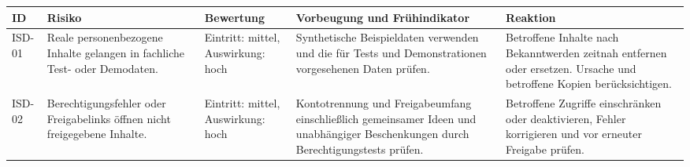 \documentclass[11pt,a4paper]{article}
\begin{document}
\begin{tabularx}{\linewidth}{@{}l Y p{2cm} Y Y@{}}
\toprule
\textbf{ID} & \textbf{Risiko} & \textbf{Bewertung} & \textbf{Vorbeugung und Frühindikator} & \textbf{Reaktion} \\
\midrule
ISD-01 & Reale personenbezogene Inhalte gelangen in fachliche Test- oder Demodaten. & Eintritt: mittel, Auswirkung: hoch & Synthetische Beispieldaten verwenden und die für Tests und Demonstrationen vorgesehenen Daten prüfen. & Betroffene Inhalte nach Bekanntwerden zeitnah entfernen oder ersetzen. Ursache und betroffene Kopien berücksichtigen. \\
ISD-02 & Berechtigungsfehler oder Freigabelinks öffnen nicht freigegebene Inhalte. & Eintritt: mittel, Auswirkung: hoch & Kontotrennung und Freigabeumfang einschließlich gemeinsamer Ideen und unabhängiger Beschenkungen durch Berechtigungstests prüfen. & Betroffene Zugriffe einschränken oder deaktivieren, Fehler korrigieren und vor erneuter Freigabe prüfen. \\
\bottomrule
\end{tabularx}

\clearpage
{}
\renewcommand{\refname}{Quellen und Grundlagen}
\nocite{*}


\end{document}
